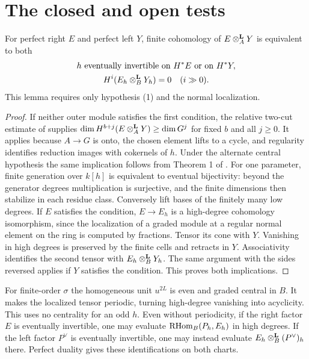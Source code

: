 \documentclass[11pt]{article}
\begin{document}
\section{The closed and open tests}
\begin{lem}\label{detect}
For perfect right $E$ and perfect left $Y$, finite cohomology of
$E\otimes^{\mathbf L}_A Y$ is equivalent to both
\[
 \begin{gathered}
 h\text{ eventually invertible on }H^*E\text{ or on }H^*Y,\\
 H^{i}(E_h\otimes^{\mathbf L}_B Y_h)=0\quad(i\gg0).
 \end{gathered}
\]
This lemma requires only hypothesis (1) and the normal localization.
\end{lem}
\begin{proof}
If neither outer module satisfies the first condition, the relative
two-cut estimate of  supplies $\dim H^{b+j}(E\otimes^{\mathbf L}_A Y)\ge\dim G^j$ for fixed
$b$ and all $j\ge0$. It applies because $A\to G$ is onto, the chosen
element lifts to a cycle, and regularity identifies reduction images
with cokernels of $h$. Under the alternate central hypothesis the
same implication follows from Theorem 1 of
.
For one parameter, finite generation over $k[h]$ is equivalent to
eventual bijectivity: beyond the generator degrees multiplication is
surjective, and the finite dimensions then stabilize in each residue
class. Conversely lift bases of the finitely many low degrees.
If $E$ satisfies the condition, $E\to E_h$ is a high-degree cohomology
isomorphism, since the localization of a graded module at a regular normal
element on the ring is computed by fractions. Tensor its cone with $Y$.
Vanishing in high degrees is preserved by the finite cells and retracts
in $Y$. Associativity identifies the second tensor with
$E_h\otimes^{\mathbf L}_B Y_h$. The same argument with the sides reversed applies if
$Y$ satisfies the condition. This proves both implications.
\end{proof}

For finite-order $\sigma$ the homogeneous unit $u^{2L}$ is even and
graded central in $B$. It makes the localized tensor periodic, turning
high-degree vanishing into acyclicity. This uses no centrality for an
odd $h$. Even without periodicity, if the right factor $E$ is eventually
invertible, one may evaluate $\operatorname{RHom}_B(P_h,E_h)$ in high degrees.
If the left factor $P^\vee$ is eventually invertible, one may instead
evaluate $E_h\otimes^{\mathbf L}_B(P^\vee)_h$ there. Perfect duality gives these
identifications on both charts.
\end{document}
